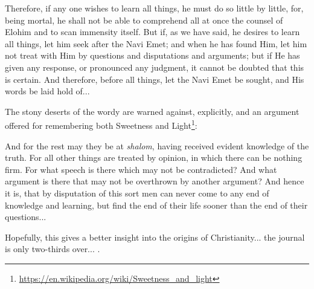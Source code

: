 \begin{quotex}
Therefore, if any one wishes to learn all things, he must do so little by little, for, being mortal, he shall not be able to comprehend all at once the counsel of Elohim and to scan immensity itself. But if, as we have said, he desires to learn all things, let him seek after the Navi Emet; and when he has found Him, let him not treat with Him by questions and disputations and arguments; but if He has given any response, or pronounced any judgment, it cannot be doubted that this is certain. And therefore, before all things, let the Navi Emet be sought, and His words be laid hold of... \end{quotex}


The stony deserts of the wordy are warned against, explicitly, and an argument offered for remembering both Sweetness and Light\footnote{\url{https://en.wikipedia.org/wiki/Sweetness\_and\_light}}:

\begin{quotex}
And for the rest may they be at \emph{shalom}, having received evident knowledge of the truth. For all other things are treated by opinion, in which there can be nothing firm. For what speech is there which may not be contradicted? And what argument is there that may not be overthrown by another argument? And hence it is, that by disputation of this sort men can never come to any end of knowledge and learning, but find the end of their life sooner than the end of their questions... 
\end{quotex}


Hopefully, this gives a better insight into the origins of Christianity... the journal is only two-thirds over... .



